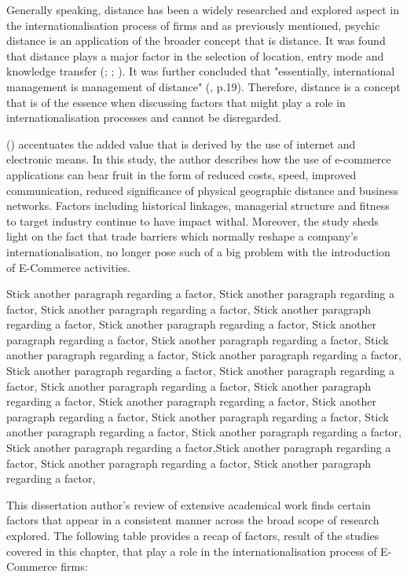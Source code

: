 \documentclass[12pt,a4paper]{article}
\begin{document}
Generally speaking, distance has been a widely researched and explored aspect in the internationalisation process of firms and as previously mentioned, psychic distance is an application of the broader concept that is distance. It was found that distance plays a major factor in the selection of location, entry mode and knowledge transfer (\cite{xuInstitutionalDistanceMultinational2002}; \cite{kostovaTransnationalTransferStrategic1999}; \cite{tihanyiEffectCulturalDistance2005}). It was further concluded that "essentially, international management is management of distance" (\cite{zaheerDistanceDirectionRestoring2012}, p.19). Therefore, distance is a concept that is of the essence when discussing factors that might play a role in internationalisation processes and cannot be disregarded. \par
\citeauthor{terziImpactEcommerceInternational2011} (\citeyear{terziImpactEcommerceInternational2011}) accentuates the added value that is derived by the use of internet and electronic means. In this study, the author describes how the use of e-commerce applications can bear fruit in the form of reduced costs, speed, improved communication, reduced significance of physical geographic distance and business networks. Factors including historical linkages, managerial structure and fitness to target industry continue to have impact withal. Moreover, the study sheds light on the fact that trade barriers which normally reshape a company's internationalisation, no longer pose such of a big problem with the introduction of E-Commerce activities. \par
Stick another paragraph regarding a factor, Stick another paragraph regarding a factor, Stick another paragraph regarding a factor, Stick another paragraph regarding a factor, Stick another paragraph regarding a factor, Stick another paragraph regarding a factor, Stick another paragraph regarding a factor, Stick another paragraph regarding a factor, Stick another paragraph regarding a factor, Stick another paragraph regarding a factor, Stick another paragraph regarding a factor, Stick another paragraph regarding a factor, Stick another paragraph regarding a factor, Stick another paragraph regarding a factor, Stick another paragraph regarding a factor, Stick another paragraph regarding a factor, Stick another paragraph regarding a factor, Stick another paragraph regarding a factor, Stick another paragraph regarding a factor,Stick another paragraph regarding a factor, Stick another paragraph regarding a factor, Stick another paragraph regarding a factor,  \par
This dissertation author's review of extensive academical work finds certain factors that appear in a consistent manner across the broad scope of research explored. The following table provides a recap of factors, result of the studies covered in this chapter, that play a role in the internationalisation process of E-Commerce firms:
\end{document}
